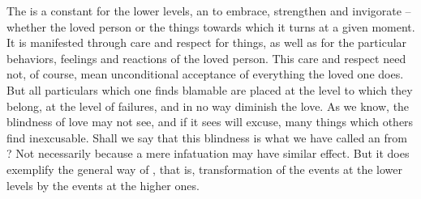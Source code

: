 The  is a constant  for the lower levels, an
 to embrace, strengthen and invigorate -- whether the loved
person or the things towards which it turns at a given moment.  It is manifested
through care and respect for things, as well as for the particular behaviors,
feelings and reactions of the loved person. This care and respect need not, of course, mean
unconditional acceptance of everything the loved one does.  But all particulars
which one finds blamable are placed at the level to which they belong, at the
level of  failures, and in no way diminish the love.  As we know,
the blindness of love may not see, and if it sees will excuse, many things which
others find inexcusable.  Shall we say that this blindness is what we have
called an  from ? Not necessarily because a mere
infatuation may have similar effect. But it does exemplify the general way of
, that is, transformation of the events at the lower
levels by the  events at the higher ones.

